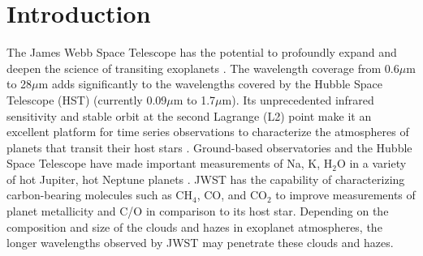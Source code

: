 \documentclass[iop]{emulateapj}
\begin{document}



\section{Introduction}

The James Webb Space Telescope \citep[JWST; e.g.][]{gardner2006SSRv} has the potential to profoundly expand and deepen the science of transiting exoplanets \citep[e.g.][]{greene2016jwst_trans}.
The wavelength coverage from 0.6$\mu$m to 28$\mu$m adds significantly to the wavelengths covered by the Hubble Space Telescope (HST) (currently 0.09$\mu$m to 1.7$\mu$m).
Its unprecedented infrared sensitivity and stable orbit at the second Lagrange (L2) point make it an excellent platform for time series observations to characterize the atmospheres of planets that transit their host stars \citep{beichman2014pasp,stevenson2016ers}.
Ground-based observatories and the Hubble Space Telescope have made important measurements of Na, K, H$_2$O in a variety of hot Jupiter, hot Neptune planets \cite[e.g.][]{snellen2008Na209,kreidberg2014wasp43,fraine2014hatp11,deming13,sing2016continuum}.
JWST has the capability of characterizing carbon-bearing molecules such as CH$_4$, CO, and CO$_2$ to improve measurements of planet metallicity and C/O in comparison to its host star.
Depending on the composition and size of the clouds and hazes in exoplanet atmospheres, the longer wavelengths observed by JWST may penetrate these clouds and hazes.
\end{document}
